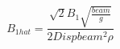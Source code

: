 \begin{equation} \label{eq:B_1_hat_equation}
B_{1 hat} = \frac{\sqrt{2} B_{1} \sqrt{\frac{beam}{g}}}{2 Disp beam^{2} \rho}
\end{equation}
